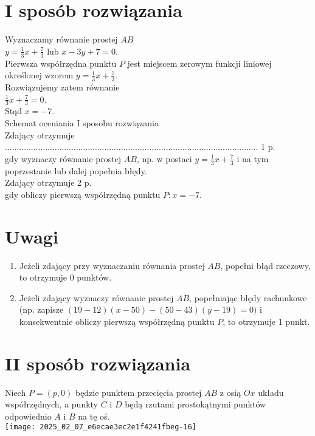 \documentclass[10pt]{article}
\begin{document}
\section*{I sposób rozwiązania}
Wyznaczamy równanie prostej $A B$\\
$y=\frac{1}{3} x+\frac{7}{3}$ lub $x-3 y+7=0$.\\
Pierwsza współrzędna punktu $P$ jest miejscem zerowym funkcji liniowej określonej wzorem $y=\frac{1}{3} x+\frac{7}{3}$.\\
Rozwiązujemy zatem równanie\\
$\frac{1}{3} x+\frac{7}{3}=0$.\\
Stąd $x=-7$.\\
Schemat oceniania I sposobu rozwiązania\\
Zdający otrzymuje ........................................................................................................... 1 p.\\
gdy wyznaczy równanie prostej $A B$, np. w postaci $y=\frac{1}{3} x+\frac{7}{3}$ i na tym poprzestanie lub dalej popełnia błędy.\\
Zdający otrzymuje 2 p.\\
gdy obliczy pierwszą współrzędną punktu $P: x=-7$.

\section*{Uwagi}
\begin{enumerate}
  \item Jeżeli zdający przy wyznaczaniu równania prostej $A B$, popełni błąd rzeczowy, to otrzymuje 0 punktów.
  \item Jeżeli zdający wyznaczy równanie prostej $A B$, popełniając błędy rachunkowe (np. zapisze $(19-12)(x-50)-(50-43)(y-19)=0)$ i konsekwentnie obliczy pierwszą współrzędną punktu $P$, to otrzymuje 1 punkt.
\end{enumerate}

\section*{II sposób rozwiązania}
Niech $P=(p, 0)$ będzie punktem przecięcia prostej $A B$ z osią $O x$ układu współrzędnych, a punkty $C$ i $D$ będą rzutami prostokątnymi punktów odpowiednio $A$ i $B$ na tę oś.\\
\texttt{[image: 2025\_02\_07\_e6ecae3ec2e1f4241fbeg-16]}
\end{document}
